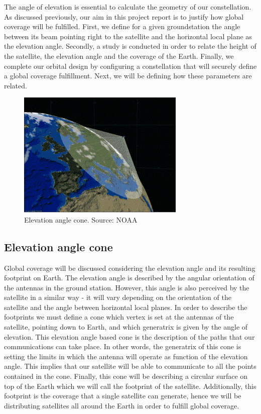 The angle of elevation is essential to calculate the geometry of our constellation. As discussed previously, our aim in this project report is to justify how global coverage will be fulfilled. First, we define for a given groundstation the angle between its beam pointing right to the satellite and the horizontal local plane as the elevation angle. Secondly, a study is conducted in order to relate the height of the satellite, the elevation angle and the coverage of the Earth. Finally, we complete our orbital design by configuring a constellation that will securely define a global coverage fulfillment. Next, we will be defining how these parameters are related. 

\begin{figure}[H]
\includegraphics[width=8cm]{noaa}
\centering
\caption{Elevation angle cone. Source: NOAA}
\end{figure}

\subsection{Elevation angle cone}
Global coverage will be discussed considering the elevation angle and its resulting footprint on Earth. The elevation angle is described by the angular orientation of the antennas in the ground station. However, this angle is also perceived by the satellite in a similar way - it will vary depending on the orientation of the satellite and the angle between horizontal local planes. In order to describe the footprints we must define a cone which vertex is set at the antennas of the satellite, pointing down to Earth, and which generatrix is given by the angle of elevation. This elevation angle based cone is the description of the paths that our communications can take place. In other words, the generatrix of this cone is setting the limits in which the antenna will operate as function of the elevation angle. This implies that our satellite will be able to communicate to all the points contained in the cone. Finally, this cone will be describing a circular surface on top of the Earth which we will call the footprint of the satellite. Additionally, this footprint is the coverage that a single satellite can generate, hence we will be distributing satellites all around the Earth in order to fulfill global coverage. 

